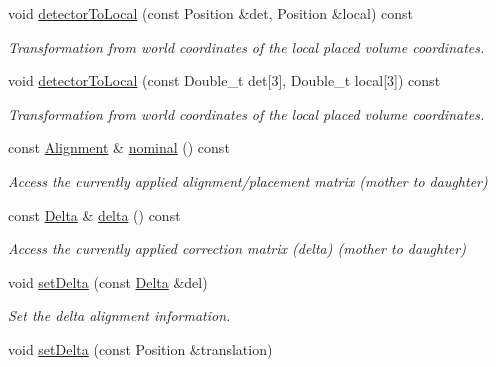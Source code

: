 \begin{DoxyCompactItemize}
void \hyperlink{class_d_d4hep_1_1_alignments_1_1_alignment_decorator_a0448f46243dcf50434e1b44b15a2d5bc}{detector\+To\+Local} (const Position \&det, Position \&local) const
\begin{DoxyCompactList}\small\item\em Transformation from world coordinates of the local placed volume coordinates. \end{DoxyCompactList}\item 
void \hyperlink{class_d_d4hep_1_1_alignments_1_1_alignment_decorator_adf3febc4006482275c8e322a0abb8a3a}{detector\+To\+Local} (const Double\+\_\+t det\mbox{[}3\mbox{]}, Double\+\_\+t local\mbox{[}3\mbox{]}) const
\begin{DoxyCompactList}\small\item\em Transformation from world coordinates of the local placed volume coordinates. \end{DoxyCompactList}\item 
const \hyperlink{class_d_d4hep_1_1_alignments_1_1_alignment}{Alignment} \& \hyperlink{class_d_d4hep_1_1_alignments_1_1_alignment_decorator_a1c7bd64cb3ba66fc3c3c91f23f039e6e}{nominal} () const
\begin{DoxyCompactList}\small\item\em Access the currently applied alignment/placement matrix (mother to daughter) \end{DoxyCompactList}\item 
const \hyperlink{class_d_d4hep_1_1_alignments_1_1_alignment_decorator_aafa729192cc27e7d36f6e9cfd3484289}{Delta} \& \hyperlink{class_d_d4hep_1_1_alignments_1_1_alignment_decorator_a58a61705cac8fe6e0b5de75959491f62}{delta} () const
\begin{DoxyCompactList}\small\item\em Access the currently applied correction matrix (delta) (mother to daughter) \end{DoxyCompactList}\item 
void \hyperlink{class_d_d4hep_1_1_alignments_1_1_alignment_decorator_a6eec8976056b3a07c214ad809f403b67}{set\+Delta} (const \hyperlink{class_d_d4hep_1_1_alignments_1_1_alignment_decorator_aafa729192cc27e7d36f6e9cfd3484289}{Delta} \&del)
\begin{DoxyCompactList}\small\item\em Set the delta alignment information. \end{DoxyCompactList}\item 
void \hyperlink{class_d_d4hep_1_1_alignments_1_1_alignment_decorator_a46ef14105fac953846eba7dc798f3357}{set\+Delta} (const Position \&translation)

\end{DoxyCompactItemize}
